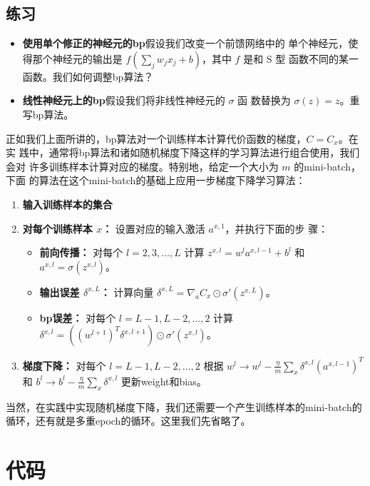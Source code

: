 \subsection*{练习}

\begin{itemize}
\item \textbf{使用单个修正的神经元的\gls*{bp}}\quad 假设我们改变一个前馈网络中的
  单个神经元，使得那个神经元的输出是 $f(\sum_j w_jx_j + b)$，其中 $f$ 是和 S 型
  函数不同的某一函数。我们如何调整\gls*{bp}算法？
\item \textbf{线性神经元上的\gls*{bp}}\quad 假设我们将非线性神经元的 $\sigma$ 函
  数替换为 $\sigma(z) = z$。重写\gls*{bp}算法。
\end{itemize}

正如我们上面所讲的，\gls*{bp}算法对一个训练样本计算代价函数的梯度，$C=C_x$。在实
践中，通常将\gls*{bp}算法和诸如随机梯度下降这样的学习算法进行组合使用，我们会对
许多训练样本计算对应的梯度。特别地，给定一个大小为 $m$ 的\gls*{mini-batch}，下面
的算法在这个\gls*{mini-batch}的基础上应用一步梯度下降学习算法：

\begin{enumerate}
\item \textbf{输入训练样本的集合}
\item \textbf{对每个训练样本 $x$：} 设置对应的输入激活 $a^{x,1}$，并执行下面的步
  骤：
  \begin{itemize}
  \item \textbf{前向传播：} 对每个 $l=2,3,...,L$ 计算 $z^{x,l} = w^la^{x,l-1} +
    b^l$ 和 $a^{x,l} = \sigma(z^{x,l})$。
  \item \textbf{输出误差 $\delta^{x,L}$：} 计算向量
    $\delta^{x,L} = \nabla_a C_x \odot \sigma'(z^{x,L})$。
  \item \textbf{\gls*{bp}误差：} 对每个 $l=L-1, L-2, ..., 2$ 计算
    $\delta^{x,l} = ((w^{l+1})^T\delta^{x,l+1})\odot \sigma'(z^{x,l})$。
  \end{itemize}
\item \textbf{梯度下降：} 对每个 $l=L-1, L-2, ..., 2$ 根据 $w^l \rightarrow w^l
  - \frac{\eta}{m}\sum_x \delta^{x,l}(a^{x,l-1})^T$ 和 $b^l \rightarrow b^l -
  \frac{\eta}{m}\sum_x \delta^{x,l}$ 更新\gls*{weight}和\gls*{bias}。
\end{enumerate}

当然，在实践中实现随机梯度下降，我们还需要一个产生训练样本的\gls*{mini-batch}的
循环，还有就是多重\gls*{epoch}的循环。这里我们先省略了。

\section{代码}
\label{sec:the_code_for_backpropagation}


